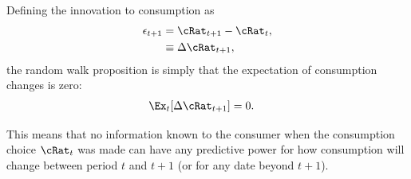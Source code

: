 Defining the innovation to consumption as
\begin{equation}\begin{gathered}\begin{aligned}
  \epsilon_{t+1} & =  \cRat_{t+1}-\cRat_{t},
\\ & \equiv  \Delta \cRat_{t+1}
,
\end{aligned}\end{gathered}\end{equation}
the random walk proposition is simply that
the expectation of consumption changes is zero:
\begin{equation}\begin{gathered}\begin{aligned}
  \Ex_{t}[\Delta \cRat_{t+1}] & =  0.
\end{aligned}\end{gathered}\end{equation}

This means that no information known to the consumer when
the consumption choice $\cRat_{t}$ was made can have any predictive
power for how consumption will change between period $t$ and
$t+1$ (or for any date beyond $t+1$).

